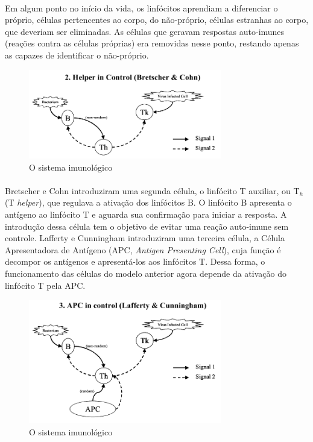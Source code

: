 \documentclass{iiufrgs}
\begin{document}
\paragraph{}Em algum ponto no início da vida, os linfócitos aprendiam a diferenciar o próprio, células pertencentes ao corpo, do não-próprio, células estranhas ao corpo, que deveriam ser eliminadas. As células que geravam respostas auto-imunes (reações contra as células próprias) era removidas nesse ponto, restando apenas as capazes de identificar o não-próprio.

\begin{figure}[h]
\centering
\includegraphics[width=0.75\textwidth]{img/signals2-helper.png}
\caption{O sistema imunológico}
\end{figure}

\paragraph{}Bretscher e Cohn introduziram uma segunda célula, o linfócito T auxiliar, ou T$_{h}$ (T \emph{helper}), que regulava a ativação dos linfócitos B. O linfócito B apresenta o antígeno ao linfócito T e aguarda sua confirmação para iniciar a resposta. A introdução dessa célula tem o objetivo de evitar uma reação auto-imune sem controle. Lafferty e Cunningham introduziram uma terceira célula, a Célula Apresentadora de Antígeno (APC, \emph{Antigen Presenting Cell}), cuja função é decompor os antígenos e apresentá-los aos linfócitos T. Dessa forma, o funcionamento das células do modelo anterior agora depende da ativação do linfócito T pela APC.

\begin{figure}[h]
\centering
\includegraphics[width=0.75\textwidth]{img/signals3-apc.png}
\caption{O sistema imunológico}
\end{figure}
\end{document}
